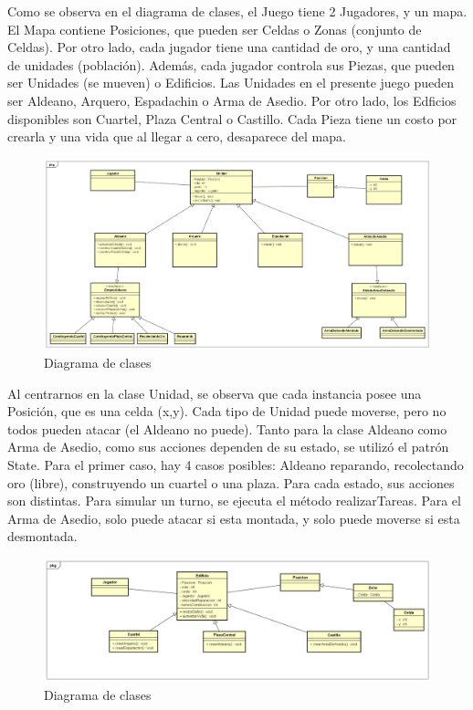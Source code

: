 \documentclass[titlepage,a4paper]{article}
\begin{document}
Como se observa en el diagrama de clases, el Juego tiene 2 Jugadores, y un mapa. El Mapa contiene Posiciones, que pueden ser Celdas o Zonas (conjunto de Celdas). Por otro lado, cada jugador tiene una cantidad de oro, y una cantidad de unidades (población). Además, cada jugador controla sus Piezas, que pueden ser Unidades (se mueven) o Edificios. Las Unidades en el presente juego pueden ser Aldeano, Arquero, Espadachin o Arma de Asedio. Por otro lado, los Edficios disponibles son Cuartel, Plaza Central o Castillo. Cada Pieza tiene un costo por crearla y una vida que al llegar a cero, desaparece del mapa. 

\begin{figure}[H]
	\centering
	\includegraphics[width=1.15\textwidth]{unidad.png}
	\caption{\label{fig:class01}Diagrama de clases }
\end{figure}

Al centrarnos en la clase Unidad, se observa que cada instancia posee una Posición, que es una celda (x,y). Cada tipo de Unidad puede moverse, pero no todos pueden atacar (el Aldeano no puede). Tanto para la clase Aldeano como Arma de Asedio, como sus acciones dependen de su estado, se utilizó el patrón State. Para el primer caso, hay 4 casos posibles: Aldeano reparando, recolectando oro (libre), construyendo un cuartel o una plaza. Para cada estado, sus acciones son distintas. Para simular un turno, se ejecuta el método realizarTareas. Para el Arma de Asedio, solo puede atacar si esta montada, y solo puede moverse si esta desmontada.  

\begin{figure}[H]
	\centering
	\includegraphics[width=1.15\textwidth]{edificio.png}
	\caption{\label{fig:class01}Diagrama de clases }
\end{figure}
\end{document}
